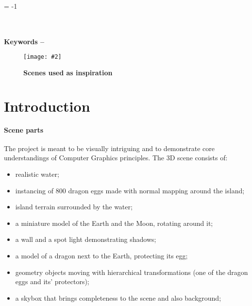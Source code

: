 \documentclass[10pt, a4paper]{article}
\title{\mytitle}
\author{\myauthor\hspace{1em}\\\contact\\Edinburgh Napier University\hspace{0.5em}-\hspace{0.5em}\mymodule}
\date{}
\newcommand{\figuremacro}[5]{
    \begin{figure}[#1]
        \centering
        \texttt{[image: \#2]}
        \caption[#3]{\textbf{#3}#4}
        \label{fig:#2}
    \end{figure}
}
\begin{document}
	
	
	\hyphenchar\font = -1
	
	\maketitle
	\begin{abstract}
		 The aim of this project is to create a realistic 3D scene, rendered in real-time. The project is inspired by the series \textit{Games of Thrones}\cite{dragons} (see \textbf{Figure {\ref{fig:inspiration}}}) and previous years projects found on the games website\cite{gamesWebsite} of Napier University. A wide variety of graphics techniques were used to create the 3D scene, from material shading and post-processing effects to reflective and refractive rippling water. This report covers how the scene was implemented and what future work is considered. Video demonstrating the 3D scene can be found \underline{here}\cite{video}.
	\end{abstract}
	\\\\
	\textbf{Keywords -- }{\mykeywords}
	\figuremacro{h}{inspiration}{Scenes used as inspiration}{ }{1.0}	
    
	\section{Introduction}
    \paragraph{Scene parts} The project is meant to be visually intriguing and to demonstrate core understandings of Computer Graphics principles. The 3D scene consists of:   
    \begin{itemize}
    	\item realistic water;
    	\item instancing of 800 dragon eggs made with normal mapping around the island;
    	\item island terrain surrounded by the water;   
    	\item a miniature model of the Earth and the Moon, rotating around it;
    	\item a wall and a spot light demonstrating shadows;
    	\item a model of a dragon next to the Earth, protecting its egg;
    	\item geometry objects moving with hierarchical transformations (one of the dragon eggs and its' protectors);
    	\item a skybox that brings completeness to the scene and also background;	
    \end{itemize}
    
\end{document}

